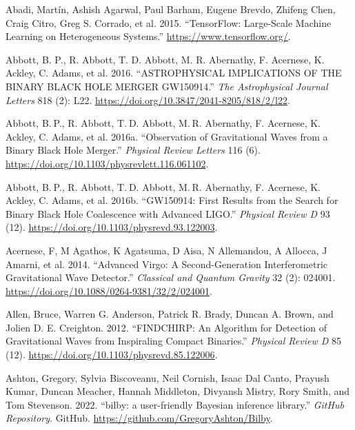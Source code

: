 \documentclass[10pt,a4paper,onecolumn]{article}
\newlength{\cslhangindent}
\newenvironment{CSLReferences}[3] %
 {%
  \setlength{\parindent}{0pt}
  \ifodd #1 \everypar{\setlength{\hangindent}{\cslhangindent}}\ignorespaces\fi
  \ifnum #2 > 0
  \setlength{\parskip}{#2\baselineskip}
  \fi
 }%
 {}
\begin{document}
\label{refs}
\begin{CSLReferences}{1}{0}
\bibitem[\citeproctext]{ref-tensorflow2015}
Abadi, Martín, Ashish Agarwal, Paul Barham, Eugene Brevdo, Zhifeng Chen,
Craig Citro, Greg S. Corrado, et al. 2015. {``{TensorFlow}: Large-Scale
Machine Learning on Heterogeneous Systems.''}
\url{https://www.tensorflow.org/}.

Abbott, B. P., R. Abbott, T. D. Abbott, M. R. Abernathy, F. Acernese, K.
Ackley, C. Adams, et al. 2016. {``ASTROPHYSICAL IMPLICATIONS OF THE
BINARY BLACK HOLE MERGER GW150914.''} \emph{The Astrophysical Journal
Letters} 818 (2): L22.
\url{https://doi.org/10.3847/2041-8205/818/2/l22}.

Abbott, B. P., R. Abbott, T. D. Abbott, M. R. Abernathy, F. Acernese, K.
Ackley, C. Adams, et al. 2016a. {``Observation of Gravitational Waves
from a Binary Black Hole Merger.''} \emph{Physical Review Letters} 116
(6). \url{https://doi.org/10.1103/physrevlett.116.061102}.

Abbott, B. P., R. Abbott, T. D. Abbott, M. R. Abernathy, F. Acernese, K.
Ackley, C. Adams, et al. 2016b. {``GW150914: First Results from the
Search for Binary Black Hole Coalescence with Advanced LIGO.''}
\emph{Physical Review D} 93 (12).
\url{https://doi.org/10.1103/physrevd.93.122003}.

Acernese, F, M Agathos, K Agatsuma, D Aisa, N Allemandou, A Allocca, J
Amarni, et al. 2014. {``Advanced Virgo: A Second-Generation
Interferometric Gravitational Wave Detector.''} \emph{Classical and
Quantum Gravity} 32 (2): 024001.
\url{https://doi.org/10.1088/0264-9381/32/2/024001}.

Allen, Bruce, Warren G. Anderson, Patrick R. Brady, Duncan A. Brown, and
Jolien D. E. Creighton. 2012. {``FINDCHIRP: An Algorithm for Detection
of Gravitational Waves from Inspiraling Compact Binaries.''}
\emph{Physical Review D} 85 (12).
\url{https://doi.org/10.1103/physrevd.85.122006}.

Ashton, Gregory, Sylvia Biscoveanu, Neil Cornish, Isaac Dal Canto,
Prayush Kumar, Duncan Meacher, Hannah Middleton, Divyansh Mistry, Rory
Smith, and Tom Stevenson. 2022. {``{bilby: a user-friendly Bayesian
inference library}.''} \emph{GitHub Repository}. GitHub.
\url{https://github.com/GregoryAshton/Bilby}.


\end{CSLReferences}
\end{document}
